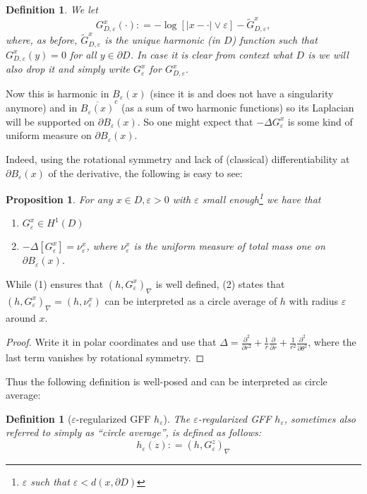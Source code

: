 \documentclass[11pt,reqno]{amsart}
\numberwithin{equation}{section}
\newtheorem{pro}[thm]{Proposition}
\newtheorem{defi}[thm]{Definition}
\newcommand{\deq}{\mathrel{\mathop:}=}
\newcommand{\eps}{\varepsilon}
\begin{document}
\begin{defi}\label{def:truncatedGreensFct}
	We let
	$$G_{D,\eps}^x(\cdot)\deq -\log[|x-\cdot|\vee \eps]-\tilde G_{D,\eps}^x,$$
	where, as before, $\tilde G_{D,\eps}^x$ is the unique harmonic (in $D$) function such that $G_{D,\eps}^x(y)=0$ for all $y\in \partial D$. In case it is clear from context what $D$ is we will also drop it and simply write $G_\eps^x$ for $G_{D,\eps}^x$.
\end{defi}

Now this is harmonic in $B_\eps(x)$ (since it is and does not have a singularity anymore) and in $\overline{B_\eps(x)}^c$ (as a sum of two harmonic functions) so its Laplacian will be supported on $\partial B_\eps(x)$. So one might expect that $-\Delta G_\eps^x$ is some kind of uniform measure on $\partial B_\eps(x)$. 

Indeed, using the rotational symmetry and lack of (classical) differentiability at $\partial B_\eps(x)$ of the derivative, the following is easy to see:

\begin{pro}\label{prop:circleAvg}
	For any $x\in D, \eps>0$ with $\eps$ small enough\footnote{$\eps$ such that $\eps<d(x,\partial D)$} we have that 
	\begin{enumerate}
		\item $G_\eps^x\in H^1(D)$
		\item $-\Delta[G_\eps^x] = \nu_\eps^x$, where $\nu_\eps^x$ is the uniform measure of total mass one on $\partial B_\eps(x)$.
	\end{enumerate}
\end{pro}

While (1) ensures that $(h,G_\eps^x)_\nabla$ is well defined, (2) states that $(h,G_\eps^x)_\nabla = (h,\nu_\eps^x)$ can be interpreted as a circle average of $h$ with radius $\eps$ around $x$.
\begin{proof}
	Write it in polar coordinates and use that $\Delta = \frac{\partial^2}{\partial r^2}+\frac{1}{r}\frac{\partial}{\partial r}+\frac{1}{r^2}\frac{\partial^2}{\partial\theta^2}$, where the last term vanishes by rotational symmetry.
\end{proof}

Thus the following definition is well-posed and can be interpreted as circle average:

\begin{defi}[$\eps$-regularized GFF $h_\eps$] The $\eps$-regularized GFF $h_\eps$, sometimes also referred to simply as ``circle average'', is defined as follows:
	$$h_\eps(z)\deq (h,G_\eps^z)_\nabla$$
\end{defi}
\end{document}

